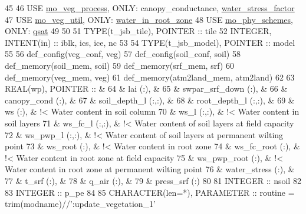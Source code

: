 \begin{DoxyCode}
45 
46     \textcolor{keywordtype}{USE }\hyperlink{namespacemo__veg__process}{mo\_veg\_process}\textcolor{keywordtype}{, ONLY}: canopy\_conductance, 
      \hyperlink{namespacemo__veg__process_a08781664d42770f4962218de89b6387d}{water\_stress\_factor}
47     \textcolor{keywordtype}{USE }\hyperlink{namespacemo__veg__util}{mo\_veg\_util}\textcolor{keywordtype}{,    ONLY}: \hyperlink{namespacemo__veg__util_af6216ea4cafe0107cd77fd3774c1b948}{water\_in\_root\_zone}
48     \textcolor{keywordtype}{USE }\hyperlink{namespacemo__phy__schemes}{mo\_phy\_schemes}\textcolor{keywordtype}{, ONLY}: \hyperlink{namespacemo__phy__schemes_aa793f9cf2db7aa0f821bde8fbf8f38a8}{qsat}
49 
50 
51     \textcolor{keywordtype}{TYPE}(t\_jsb\_tile),  \textcolor{keywordtype}{POINTER}    :: tile
52     \textcolor{keywordtype}{INTEGER},           \textcolor{keywordtype}{INTENT(in)} :: iblk, ics, ice, nc
53 
54     \textcolor{keywordtype}{TYPE}(t\_jsb\_model), \textcolor{keywordtype}{POINTER}    :: model
55 
56     def\_config(veg\_conf, veg)
57     def\_config(soil\_conf, soil)
58     def\_memory(soil\_mem, soil)
59     def\_memory(srf\_mem, srf)
60     def\_memory(veg\_mem, veg)
61     def\_memory(atm2land\_mem, atm2land)
62 
63     \textcolor{keywordtype}{REAL(wp)}, \textcolor{keywordtype}{POINTER} ::                 &
64       & lai                    (:),      &
65       & swpar\_srf\_down         (:),      &
66       & canopy\_cond            (:),      &
67       & soil\_depth\_l           (:,:),    &
68       & root\_depth\_l           (:,:),    &
69       & ws                     (:),      & !< Water content in soil column
70       & ws\_l                   (:,:),    & !< Water content in soil layers
71       & ws\_fc\_l                (:,:),    & !< Water content of soil layers at field capacity
72       & ws\_pwp\_l               (:,:),    & !< Water content of soil layers at permanent wilting point
73       & ws\_root                (:),      & !< Water content in root zone
74       & ws\_fc\_root             (:),      & !< Water content in root zone at field capacity
75       & ws\_pwp\_root            (:),      & !< Water content in root zone at permanent wilting point
76       & water\_stress           (:),      &
77       & t\_srf                  (:),      &
78       & q\_air                  (:),      &
79       & press\_srf              (:)
80 
81     \textcolor{keywordtype}{INTEGER} :: nsoil
82 
83     \textcolor{keywordtype}{INTEGER} :: p\_pe
84 
85     \textcolor{keywordtype}{CHARACTER(len=*)}, \textcolor{keywordtype}{PARAMETER} :: routine = trim(modname)//\textcolor{stringliteral}{':update\_vegetation\_1'}

\end{DoxyCode}
